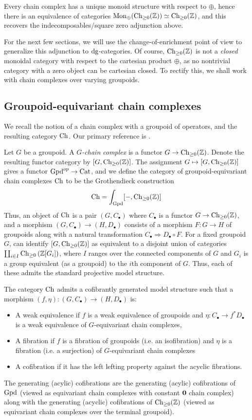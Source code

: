 \documentclass[12pt]{amsart}
\begin{document}
Every chain complex has a unique monoid structure with respect to $\oplus$, hence there is an equivalence of categories 
$\mathrm{Mon}_{\oplus}(\mathrm{Ch}_{\ge 0}(\mathbb{Z})) \simeq \mathrm{Ch}_{\ge 0}(\mathbb{Z})$, and this recovers the indecomposables/square zero adjunction above.
\par 
For the next few sections, we will use the change-of-enrichment point of view to generalize this adjunction to $\mathrm{dg}$-categories. 
Of course, $\mathrm{Ch}_{\ge 0}(\mathbb{Z})$ is not a \textit{closed} monoidal category with respect to the cartesian product $\oplus$, 
as no nontrivial category with a zero object can be cartesian closed. 
To rectify this, we shall work with chain complexes over varying groupoids. 
\subsection{Groupoid-equivariant chain complexes}
We recall the notion of a chain complex with a groupoid of operators, and the resulting category ${\mathrm{Ch}}$. Our primary reference is \cite{Brown_Higgins_Sivera_2011}. 
\par 
Let $G$ be a groupoid. A \emph{$G$-chain complex} is a functor $G \to \mathrm{Ch}_{\ge 0}(\mathbb{Z})$. 
Denote the resulting functor category by $[G, \mathrm{Ch}_{\ge 0}(\mathbb{Z})]$.
The assignment $G \mapsto [G, \mathrm{Ch}_{\ge 0}(\mathbb{Z})]$ gives a functor $\mathrm{Gpd}^{op} \to \mathrm{Cat}$, and we define the category of groupoid-equivariant chain complexes ${\mathrm{Ch}}$ to be the Grothendieck construction
$${\mathrm{Ch}} = \int_{\mathrm{Gpd}}[-, \mathrm{Ch}_{\ge 0}(\mathbb{Z})]$$
Thus, an object of ${\mathrm{Ch}}$ is a pair $(G, C_\bullet)$ where $C_\bullet$ is a functor $G \to \mathrm{Ch}_{\ge 0}(\mathbb{Z})$, and a morphism $(G, C_\bullet) \to (H, D_\bullet)$ consists of a morphism $F: G \to H$ of groupoids along with a natural transformation $C_\bullet \Rightarrow D_\bullet \circ F$. 
For a fixed groupoid $G$, can identify $[G,\mathrm{Ch}_{\ge 0}(\mathbb{Z})]$ as equivalent to a disjoint union of categories $\coprod_{i \in I} \mathrm{Ch}_{\ge 0}\left(\mathbb{Z}[G_i]\right)$, where $I$ ranges over the connected components of $G$ and $G_i$ is a group equivalent (as a groupoid) to the $i$th component of $G$. 
Thus, each of these admits the standard projective model structure. 
\begin{theorem}
 	The category ${\mathrm{Ch}}$ admits a cofibrantly generated model structure such that a morphism $(f, \eta): (G, C_\bullet) \to (H, D_\bullet)$ is:
 	\begin{itemize}
 		\item A weak equivalence if $f$ is a weak equivalence of groupoids and $\eta: C_\bullet \to f^*D_\bullet$ is a weak equivalence of $G$-equivariant chain complexes,
 		\item A fibration if $f$ is a fibration of groupoids (i.e. an isofibration) and $\eta$ is a fibration (i.e. a surjection) of $G$-equivariant chain complexes
 		\item A cofibration if it has the left lefting property against the acyclic fibrations.
 	\end{itemize}
 	The generating (acylic) cofibrations are the generating (acylic) cofibrations of $\mathrm{Gpd}$ (viewed as equivariant chain complexes with constant $\mathbf{0}$ chain complex) along with the generating (acyclic) cofibrations of $\mathrm{Ch}_{\ge 0}(\mathbb{Z})$ (viewed as equivariant chain complexes over the terminal groupoid).
\end{theorem}
\end{document}
